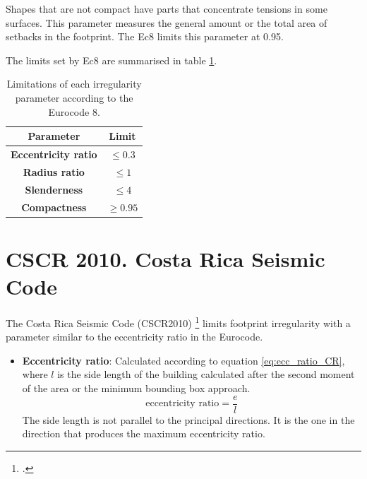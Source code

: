 \begin{refsection}
\begin{itemize}
    Shapes that are not compact have parts that concentrate tensions in some surfaces. This parameter measures the general amount or the total area of setbacks in the footprint. The Ec8 limits this parameter at 0.95. 
\end{itemize}

The limits set by Ec8 are summarised in table \ref{tab:EC8_limits}. 

\begin{table}[h]
    \centering
    \caption{Limitations of each irregularity parameter according to the Eurocode 8.}
    \begin{tabular}{|c|c|}
        \hline
        \textbf{Parameter} & \textbf{Limit}\\
        \hline
        \textbf{Eccentricity ratio} & $\leq 0.3$\\
        \hline
        \textbf{Radius ratio}  & $\leq1$\\
        \hline
        \textbf{Slenderness}  & $\leq4$\\
        \hline
        \textbf{Compactness}  & $\ge0.95$\\
        \hline
    \end{tabular}
    \label{tab:EC8_limits}
\end{table}


\FloatBarrier

\renewcommand{\sectionnametext}{CSCR 2010. Costa Rica Seismic Code}
\renewcommand{\headingtextR}{\thesection. \sectionnametext}
\section{\sectionnametext}
\label{sec:CSCR}

The Costa Rica Seismic Code (CSCR2010) \footcite{cfia_colegio_federado_de_ingenieros_y_arquitectos_de_costa_rica_codigo_2016} limits footprint irregularity with a parameter similar to the eccentricity ratio in the Eurocode. 

\begin{itemize}
    \item \textbf{Eccentricity ratio}: Calculated according to equation \ref{eq:ecc_ratio_CR}, where $l$ is the side length of the building calculated after the second moment of the area or the minimum bounding box approach. 
    \begin{equation}
        \label{eq:ecc_ratio_CR}
        \text{eccentricity ratio} = \frac{e}{l}
    \end{equation}
    The side length is not parallel to the principal directions. It is the one in the direction that produces the maximum eccentricity ratio. 
\end{itemize}


\end{refsection}
